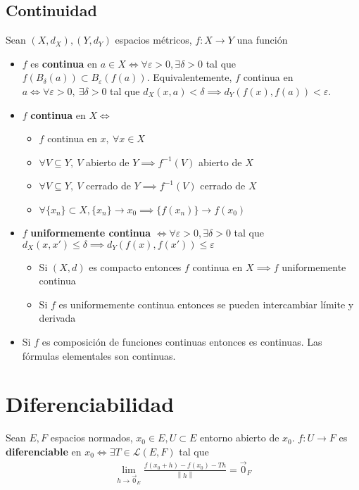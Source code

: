 \documentclass[a4paper,twocolumn]{extarticle}
\newcommand{\norma}[1]{\left\lVert#1\right\rVert}
\newcommand{\lacot}[1]{\mathcal{L}(#1)}
\begin{document}
\subsection{Continuidad}

Sean $(X, d_X), (Y, d_Y)$ espacios métricos, $f:X \to Y$ una función

\begin{itemize}
	\item $f$ es \textbf{continua} en $a \in X \iff \forall \varepsilon > 0, \exists \delta > 0$ tal que $f(B_\delta(a)) \subset B_\varepsilon(f(a))$. Equivalentemente, $f$ continua en $a \iff \forall \varepsilon > 0,\ \exists \delta > 0$ tal que $d_X(x, a) < \delta \implies d_Y(f(x), f(a)) < \varepsilon$.
	\item $f$ \textbf{continua} en $X \iff$
	\begin{itemize}
		\item $f$ continua en $x,\ \forall x \in X$
		\item $\forall V \subseteq Y,\ V$ abierto de $Y \implies f^{-1}(V)$ abierto de $X$
		\item $\forall V \subseteq Y,\ V$ cerrado de $Y \implies f^{-1}(V)$ cerrado de $X$
		\item $\forall \{x_n\} \subset X, \{x_n\} \to x_0 \implies \{f(x_n)\} \to f(x_0)$
	\end{itemize}
	
	\item $f$ \textbf{uniformemente continua} $\iff \forall \varepsilon > 0, \exists \delta > 0$ tal que $d_X(x, x') \leq \delta \implies d_Y(f(x), f(x')) \leq \varepsilon$
	\begin{itemize}
		\item Si $(X,d)$ es compacto entonces $f$ continua en $X \implies f$ uniformemente continua
		\item Si $f$ es uniformemente continua entonces se pueden intercambiar límite y derivada
	\end{itemize}
	\item Si $f$ es composición de funciones continuas entonces es continuas. Las fórmulas elementales son continuas.
\end{itemize}

\section{Diferenciabilidad}
Sean $E, F$ espacios normados, $x_0 \in E, U \subset E$ entorno abierto de $x_0$. $f:U \to F$ es \textbf{diferenciable} en $x_0 \iff \exists T \in \lacot{E, F}$ tal que
\begin{align*}
	\lim_{h \to \vec{0}_E} \frac{f(x_0 + h) - f(x_0) - Th}{\norma{h}} = \vec{0}_F
\end{align*}
\end{document}
